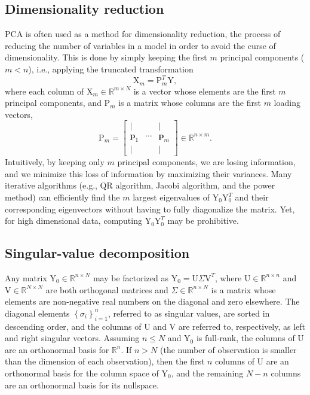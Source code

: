 \documentclass[journal]{IEEEtran}
\begin{document}
\subsection{Dimensionality reduction}
PCA is often used as a method for dimensionality reduction, the process of reducing the number of variables in a model in order to avoid the curse of dimensionality. This is done by simply keeping the first $m$ principal components ($m<n$), i.e., applying the truncated transformation
\[
\text{X}_m = \text{P}_m^T \text{Y},
\]
where each column of $\text{X}_m \in \mathbb{R}^{m \times N}$ is a vector whose elements are the first $m$ principal components, and $\text{P}_m$ is a matrix whose columns are the first $m$ loading vectors,
\[
\text{P}_m = \left[\begin{array}{ccc}
\mid &  & \mid\\
\textbf{p}_{1} & \cdots & \textbf{p}_{m}\\
\mid &  & \mid
\end{array}\right] \in \mathbb{R}^{n \times m}.
\]
Intuitively, by keeping only $m$ principal components, we are losing information, and we minimize this loss of information by maximizing their variances. Many iterative algorithms (e.g., QR algorithm, Jacobi algorithm, and the power method) can efficiently find the $m$ largest eigenvalues of $\text{Y}_0 \text{Y}_0^T$ and their corresponding eigenvectors without having to fully diagonalize the matrix. Yet, for high dimensional data, computing $\text{Y}_0 \text{Y}_0^T$ may be prohibitive.

\subsection{Singular-value decomposition}
Any matrix $\text{Y}_0 \in \mathbb{R}^{n \times N}$ may be factorized as $\text{Y}_0 = \text{U} \Sigma \text{V}^T$, where $\text{U} \in \mathbb{R}^{n \times n}$ and $\text{V} \in \mathbb{R}^{N \times N}$ are both orthogonal matrices and $\Sigma \in \mathbb{R}^{n \times N}$ is a matrix whose elements are non-negative real numbers on the diagonal and zero elsewhere. The diagonal elements $\left\{ \sigma_i \right\}_{i=1}^n$, referred to as singular values, are sorted in descending order, and the columns of $\text{U}$ and $\text{V}$ are referred to, respectively, as left and right singular vectors. Assuming $n \leq N$ and $\text{Y}_0$ is full-rank, the columns of $\text{U}$ are an orthonormal basis for $\mathbb{R}^n$. If $n > N$ (the number of observation is smaller than the dimension of each observation), then the first $n$ columns of $\text{U}$ are an orthonormal basis for the column space of $\text{Y}_0$, and the remaining $N-n$ columns are an orthonormal basis for its nullspace.
\end{document}
